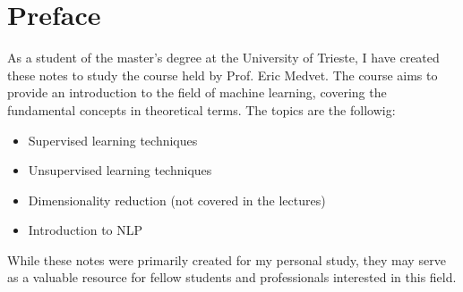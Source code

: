 \section*{Preface}

As a student of the  master's degree at the University of Trieste, I have created these notes to study the course  held by Prof. Eric Medvet. The course aims to provide an introduction to the field of machine learning, covering the fundamental concepts in theoretical terms.
The topics are the followig:
\begin{itemize}
    \item Supervised learning techniques
    \item Unsupervised learning techniques
    \item Dimensionality reduction (not covered in the lectures)
    \item Introduction to NLP
\end{itemize}
While these notes were primarily created for my personal study, they may serve as a valuable resource for fellow students and professionals interested in this field.

